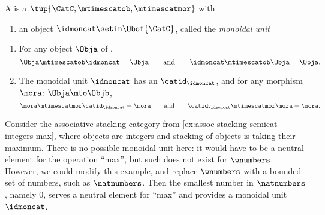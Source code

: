 \begin{ctdefinition}
    \label{def:strict-monoidal-stacking-semicat}
    A  is a  $\tup{\CatC, \mtimescatob, \mtimescatmor}$ with

    \constit

    \begin{enumerate}
        \item an object $\idmoncat \setin \Obof{\CatC}$, called the \emph{monoidal unit}
    \end{enumerate}

    \condit

    \begin{enumerate}
        \item For any object $\Obja$ of \CatC,
              \begin{equation}\label{eq:strict-mon-stacking-semicat-cond1}
                  \Obja \mtimescatob \idmoncat = \Obja \qquad \text{and} \qquad \idmoncat \mtimescatob \Obja = \Obja.
              \end{equation}
        \item The monoidal unit $\idmoncat$ has an  $\catid_\idmoncat$, and for any morphism $\mora \colon \Obja \mto \Objb$,
              \begin{equation}\label{eq:strict-mon-stacking-semicat-cond2}
                  \mora \mtimescatmor \catid_\idmoncat = \mora \qquad \text{and} \qquad \catid_\idmoncat \mtimescatmor  \mora = \mora.
              \end{equation}
    \end{enumerate}
\end{ctdefinition}


\begin{example}
    Consider the associative stacking category from \cref{ex:assoc-stacking-semicat-integers-max}, where objects are integers and stacking of objects is taking their maximum.
    There is no possible monoidal unit here: it would have to be a neutral element for the operation ``max'', but such does not exist for $\wnumbers$.
    However, we could modify this example, and replace $\wnumbers$ with a bounded set of numbers, such as $\natnumbers$.
    Then the smallest number in $\natnumbers$, namely $0$, serves a neutral element for ``max'' and provides a monoidal unit $\idmoncat$.
\end{example}


